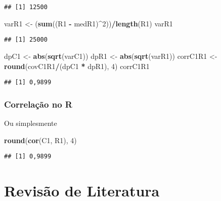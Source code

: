 \documentclass[
]{book}
\newenvironment{Shaded}{\begin{snugshade}}{\end{snugshade}}
\newcommand{\DecValTok}[1]{\textcolor[rgb]{0.00,0.00,0.81}{#1}}
\newcommand{\KeywordTok}[1]{\textcolor[rgb]{0.13,0.29,0.53}{\textbf{#1}}}
\newcommand{\NormalTok}[1]{#1}
\newcommand{\OperatorTok}[1]{\textcolor[rgb]{0.81,0.36,0.00}{\textbf{#1}}}
\newcommand{\StringTok}[1]{\textcolor[rgb]{0.31,0.60,0.02}{#1}}
\begin{document}
\begin{verbatim}
## [1] 12500
\end{verbatim}

\begin{Shaded}
\begin{Highlighting}[]
\NormalTok{varR1 <-}\StringTok{ }\NormalTok{(}\KeywordTok{sum}\NormalTok{((R1 }\OperatorTok{-}\StringTok{ }\NormalTok{medR1)}\OperatorTok{^}\DecValTok{2}\NormalTok{))}\OperatorTok{/}\KeywordTok{length}\NormalTok{(R1)}
\NormalTok{varR1}
\end{Highlighting}
\end{Shaded}

\begin{verbatim}
## [1] 25000
\end{verbatim}

\begin{Shaded}
\begin{Highlighting}[]
\NormalTok{dpC1 <-}\StringTok{ }\KeywordTok{abs}\NormalTok{(}\KeywordTok{sqrt}\NormalTok{(varC1))}
\NormalTok{dpR1 <-}\StringTok{ }\KeywordTok{abs}\NormalTok{(}\KeywordTok{sqrt}\NormalTok{(varR1))}
\NormalTok{corrC1R1 <-}\StringTok{ }\KeywordTok{round}\NormalTok{(covC1R1}\OperatorTok{/}\NormalTok{(dpC1 }\OperatorTok{*}\StringTok{ }\NormalTok{dpR1), }\DecValTok{4}\NormalTok{)}
\NormalTok{corrC1R1}
\end{Highlighting}
\end{Shaded}

\begin{verbatim}
## [1] 0,9899
\end{verbatim}

\hypertarget{correlauxe7uxe3o-no-r-1}{%
\subsection{Correlação no R}\label{correlauxe7uxe3o-no-r-1}}

Ou simplesmente

\begin{Shaded}
\begin{Highlighting}[]
\KeywordTok{round}\NormalTok{(}\KeywordTok{cor}\NormalTok{(C1, R1), }\DecValTok{4}\NormalTok{)}
\end{Highlighting}
\end{Shaded}

\begin{verbatim}
## [1] 0,9899
\end{verbatim}

\hypertarget{revisuxe3o-de-literatura}{%
\chapter{Revisão de Literatura}\label{revisuxe3o-de-literatura}}
\end{document}
